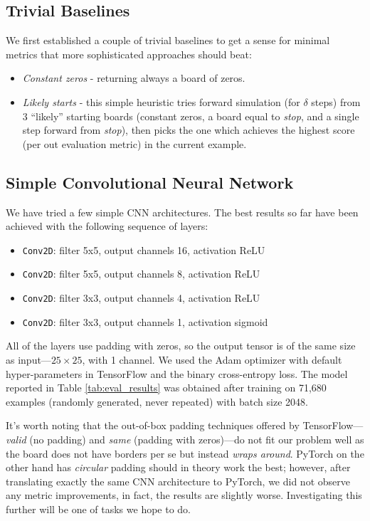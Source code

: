 \documentclass[conference]{IEEEtran}
\begin{document}
\subsection{Trivial Baselines}
We first established a couple of trivial baselines to get a sense for minimal metrics that more sophisticated approaches should beat:
\begin{itemize}
    \item {\it Constant zeros} - returning always a board of zeros.
    \item {\it Likely starts} - this simple heuristic tries forward simulation (for $\delta$ steps) from $3$ ``likely'' starting boards (constant zeros, a board equal to {\it stop}, and a single step forward from {\it stop}), then picks the one which achieves the highest score (per out evaluation metric) in the current example.
\end{itemize}

\subsection{Simple Convolutional Neural Network}

We have tried a few simple CNN architectures. The best results so far have been achieved with the following sequence of layers:

\begin{itemize}
    \item {\tt Conv2D}: filter 5x5, output channels 16, activation ReLU
    \item {\tt Conv2D}: filter 5x5, output channels 8, activation ReLU
    \item {\tt Conv2D}: filter 3x3, output channels 4, activation ReLU
    \item {\tt Conv2D}: filter 3x3, output channels 1, activation sigmoid
\end{itemize}

All of the layers use padding with zeros, so the output tensor is of the same size as input---$25 \times 25$, with 1 channel. We used the Adam optimizer with default hyper-parameters in TensorFlow and the binary cross-entropy loss. The model reported in Table \ref{tab:eval_results} was obtained after training on 71,680 examples (randomly generated, never repeated) with batch size 2048.

It's worth noting that the out-of-box padding techniques offered by TensorFlow---{\it valid} (no padding) and {\it same} (padding with zeros)---do not fit our problem well as the board does not have borders per se but instead \emph{wraps around}. PyTorch on the other hand has {\it circular} padding should in theory work the best; however, after translating exactly the same CNN architecture to PyTorch, we did not observe any metric improvements, in fact, the results are slightly worse. Investigating this further will be one of tasks we hope to do.
\end{document}
